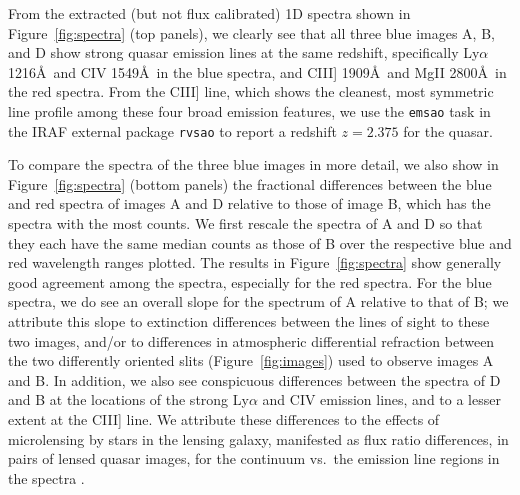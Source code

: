 \documentclass[twocolumn]{aastex6}
\begin{document}
\begin{figure*}
\caption{(Top panels:) Blue (top left) and red (top right) Gemini GMOS-S spectra
for the three blue images A (red), B (black), and D (blue).
(Bottom panels:) Fractional differences between the blue (bottom left) and
red (bottom right) spectra of A (red) or D (blue) relative to B.  
The median counts in the spectra of A and D have been rescaled
to match those of B, over the respective blue and red wavelength ranges
shown.
\label{fig:spectra}}
\end{figure*}

From the extracted (but not flux calibrated) 1D spectra shown in 
Figure~\ref{fig:spectra} (top panels),
we clearly see that all three blue images A, B, and D show strong
quasar emission lines at the same redshift, specifically 
Ly$\alpha$ 1216\AA\ and CIV 1549\AA\ in the blue spectra, 
and CIII] 1909\AA\ and MgII 2800\AA\ in the red spectra.
From the CIII] line, which shows the cleanest, most symmetric line profile
among these four broad emission features,
we use the {\tt emsao} task in the IRAF external package {\tt rvsao}
\citep{rvsao} to report a redshift $z = 2.375$ for the quasar.


To compare the spectra of the three blue images in more detail, we also show
in Figure~\ref{fig:spectra} (bottom panels) the fractional differences 
between the blue and red spectra of images A and D relative to those of
image B, which has the spectra with the most counts.  
We first rescale the spectra of A and D so that they each have the same
median counts as those of B over the respective blue and red wavelength
ranges plotted. %
The results in Figure~\ref{fig:spectra} show generally good agreement
among the spectra, especially for the red spectra.
For the blue spectra, we do see an overall slope for the spectrum of A 
relative to that of B; we attribute this slope to extinction differences 
between the lines of sight to these two images, and/or to differences in
atmospheric differential refraction between the two differently oriented
slits (Figure~\ref{fig:images}) used to observe images A and B.
In addition, we also see conspicuous differences between the spectra of D and B
at the locations of the strong Ly$\alpha$ and CIV emission lines, and to
a lesser extent at the CIII] line.
We attribute these differences to the effects of microlensing
by stars in the lensing galaxy, manifested as flux ratio differences,
in pairs of lensed quasar images, for the continuum vs.\ the emission line 
regions in the spectra \citep[e.g.,][]{motta12}.
\end{document}
